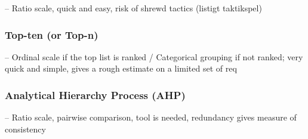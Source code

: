 -- Ratio scale, quick and easy, risk of shrewd tactics (listigt taktikspel)


\subsubsection{Top-ten (or Top-n)}

-- Ordinal scale if the top list is ranked / Categorical grouping if not ranked; very
quick and simple, gives a rough estimate on a limited set of req

\subsubsection{Analytical Hierarchy Process (AHP)}

-- Ratio scale, pairwise comparison, tool is needed, redundancy gives measure of
consistency 

